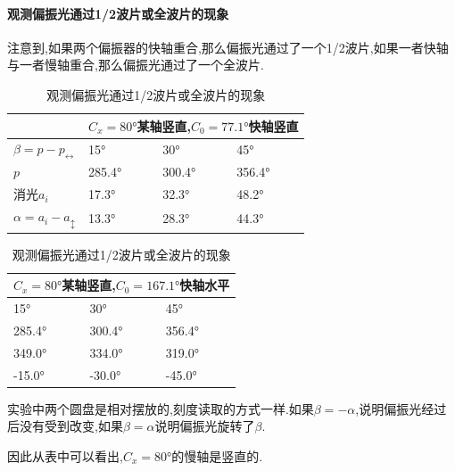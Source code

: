 \documentclass[UTF8,a4paper]{article}%
\begin{document}
\paragraph{观测偏振光通过1/2波片或全波片的现象}
注意到,如果两个偏振器的快轴重合,那么偏振光通过了一个1/2波片,如果一者快轴与一者慢轴重合,那么偏振光通过了一个全波片.
\begin{table}[H]
    \centering
    \caption{观测偏振光通过1/2波片或全波片的现象}
    \begin{tabular}{llll}
        \cline{2-4}
                                    & \multicolumn{3}{c}{$C_x=\ang{80}$某轴竖直,$C_0=\ang{77.1}$快轴竖直}                             \\ \hline
        $\beta=p-p_\leftrightarrow$ & \ang{15}                                                    & \ang{30}    & \ang{45}    \\
        $p$                         & \ang{285.4}                                                 & \ang{300.4} & \ang{356.4} \\
        消光$a_i$                     & \ang{17.3}                                                  & \ang{32.3}  & \ang{48.2}  \\
        $\alpha=a_i-a_\updownarrow$ & \ang{13.3}                                                  & \ang{28.3}  & \ang{44.3}  \\\hline
    \end{tabular}
    \begin{tabular}{lll}
        \hline
        \multicolumn{3}{c}{$C_x=\ang{80}$某轴竖直,$C_0=\ang{167.1}$快轴水平} \\
        \hline
        \ang{15}    & \ang{30}    & \ang{45}                         \\
        \ang{285.4} & \ang{300.4} & \ang{356.4}                      \\
        \ang{349.0} & \ang{334.0} & \ang{319.0}                      \\                    \ang{-15.0}                                        &    \ang{-30.0}         &     \ang{-45.0}        \\\hline
    \end{tabular}
\end{table}
实验中两个圆盘是相对摆放的,刻度读取的方式一样.如果$\beta=-\alpha$,说明偏振光经过后没有受到改变,如果$\beta=\alpha$说明偏振光旋转了$\beta$.

因此从表中可以看出,$C_x=\ang{80}$的慢轴是竖直的.
\end{document}
